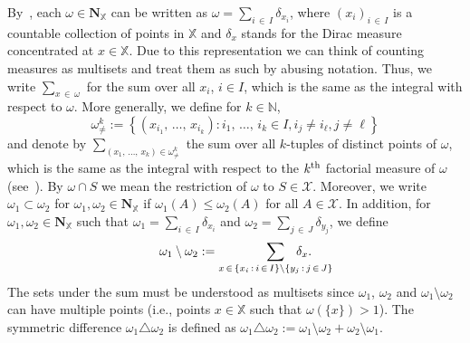 \documentclass[AHL,Unicode,longabstracts]{cedram}
\newcommand*\bN{\mathbf{N}}
\newcommand*\N{\mathbb{N}}
\newcommand*\X{\mathbb{X}}
\newcommand*\cX{\mathcal{X}}
\begin{document}
By~\cite[Proposition~6.2]{LastPenrose17}, each $\omega\in\bN_{\X}$ can be written as $\omega=\sum_{i\,\in\,I} \delta_{x_i}$, where $(x_i)_{i\,\in\,I}$ is a countable collection of points in $\X$ and $\delta_x$ stands for the Dirac measure concentrated at $x\in\X$. Due to this representation we can think of counting measures as multisets and treat them as such by abusing notation. Thus, we write $\sum_{x\,\in\,\omega}$ for the sum over all $x_i$, $i\in I$, which is the same as the integral with respect to $\omega$. More generally, we define for $k\in\N$,
\[
\omega^k_{\neq} := \left\{\left(x_{i_1},\,\hdots,\,x_{i_k}\right): i_1,\,\hdots,\,i_k\in I, i_j\neq i_\ell, j\neq \ell \right\}
\]
and denote by $\sum_{(x_1,\,\hdots,\,x_k)\in \omega^k_{\neq}}$
the sum over all $k$-tuples of distinct points of $\omega$, which is the same as the integral with respect to the {$k^{\rm th}$} factorial measure of $\omega$ (see~\cite[Subsection~4.2]{LastPenrose17}). By $\omega\cap S$ we mean the restriction of $\omega$ to $S\in\cX$. Moreover, we write $\omega_1\subset\omega_2$ for $\omega_1,\omega_2\in\bN_{\X}$ if $\omega_1(A)\leq \omega_2(A)$ for all $A\in\cX$. In addition, for $\omega_1,\omega_2\in\bN_{\X}$ such that $\omega_1=\sum_{i\,\in\,I} \delta_{x_i}$ and $\omega_2=\sum_{j\,\in\,J} \delta_{y_j}$, we define
\[
\omega_1\setminus\omega_2 := \sum_{x\,\in\,\left\{x_i\,:\,i\,\in\,I\right\}\setminus \left\{y_j\,:\,j\,\in\,J\right\}}\mkern-55mu \delta_x.
\]
The sets under the sum must be understood as multisets since $\omega_1$, $\omega_2$ and $\omega_1\setminus\omega_2$ can have multiple points (i.e., points $x\in \X$ such that $\omega(\{x\}) > 1$). The symmetric difference $\omega_1\triangle\omega_2$ is defined as $\omega_1\triangle\omega_2:=\omega_1\setminus\omega_2 + \omega_2\setminus\omega_1$.
\end{document}
